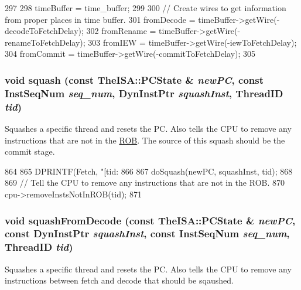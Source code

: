\begin{DoxyCode}
297 {
298     timeBuffer = time_buffer;
299 
300     // Create wires to get information from proper places in time buffer.
301     fromDecode = timeBuffer->getWire(-decodeToFetchDelay);
302     fromRename = timeBuffer->getWire(-renameToFetchDelay);
303     fromIEW = timeBuffer->getWire(-iewToFetchDelay);
304     fromCommit = timeBuffer->getWire(-commitToFetchDelay);
305 }
\end{DoxyCode}
\hypertarget{classDefaultFetch_ae16ceb7406a5afe4ea9a39fd12931d32}{
\subsubsection[{squash}]{\setlength{\rightskip}{0pt plus 5cm}void squash (const TheISA::PCState \& {\em newPC}, \/  const {\bf InstSeqNum} {\em seq\_\-num}, \/  {\bf DynInstPtr} {\em squashInst}, \/  {\bf ThreadID} {\em tid})}}
\label{classDefaultFetch_ae16ceb7406a5afe4ea9a39fd12931d32}
Squashes a specific thread and resets the PC. Also tells the CPU to remove any instructions that are not in the \hyperlink{classROB}{ROB}. The source of this squash should be the commit stage. 


\begin{DoxyCode}
864 {
865     DPRINTF(Fetch, "[tid:%
866 
867     doSquash(newPC, squashInst, tid);
868 
869     // Tell the CPU to remove any instructions that are not in the ROB.
870     cpu->removeInstsNotInROB(tid);
871 }
\end{DoxyCode}
\hypertarget{classDefaultFetch_acddf0ab1e13108e3626da3743de398b8}{
\subsubsection[{squashFromDecode}]{\setlength{\rightskip}{0pt plus 5cm}void squashFromDecode (const TheISA::PCState \& {\em newPC}, \/  const {\bf DynInstPtr} {\em squashInst}, \/  const {\bf InstSeqNum} {\em seq\_\-num}, \/  {\bf ThreadID} {\em tid})}}
\label{classDefaultFetch_acddf0ab1e13108e3626da3743de398b8}
Squashes a specific thread and resets the PC. Also tells the CPU to remove any instructions between fetch and decode that should be sqaushed. 


